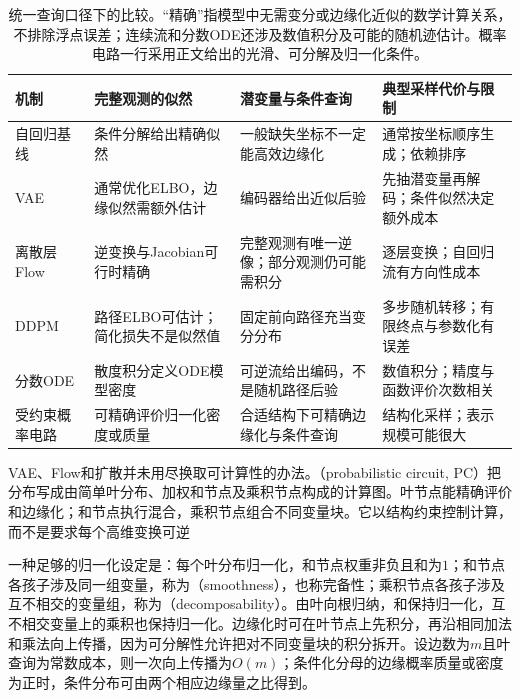 \begin{table}[htbp]
  \centering
  \small
  \begin{tabularx}{\linewidth}{@{}lXXX@{}}
    \toprule
    机制 & 完整观测的似然 & 潜变量与条件查询 & 典型采样代价与限制 \\
    \midrule
    自回归基线
      & 条件分解给出精确似然
      & 一般缺失坐标不一定能高效边缘化
      & 通常按坐标顺序生成；依赖排序 \\
    VAE
      & 通常优化ELBO，边缘似然需额外估计
      & 编码器给出近似后验
      & 先抽潜变量再解码；条件似然决定额外成本 \\
    离散层Flow
      & 逆变换与Jacobian可行时精确
      & 完整观测有唯一逆像；部分观测仍可能需积分
      & 逐层变换；自回归流有方向性成本 \\
    DDPM
      & 路径ELBO可估计；简化损失不是似然值
      & 固定前向路径充当变分分布
      & 多步随机转移；有限终点与参数化有误差 \\
    分数ODE
      & 散度积分定义ODE模型密度
      & 可逆流给出编码，不是随机路径后验
      & 数值积分；精度与函数评价次数相关 \\
    受约束概率电路
      & 可精确评价归一化密度或质量
      & 合适结构下可精确边缘化与条件查询
      & 结构化采样；表示规模可能很大 \\
    \bottomrule
  \end{tabularx}
  \caption{统一查询口径下的比较。“精确”指模型中无需变分或边缘化近似的数学计算关系，不排除浮点误差；连续流和分数ODE还涉及数值积分及可能的随机迹估计。概率电路一行采用正文给出的光滑、可分解及归一化条件。}
  \label{tab:pgm-generative-model-comparison}
\end{table}

VAE、Flow和扩散并未用尽换取可计算性的办法。（probabilistic circuit, PC）把分布写成由简单叶分布、加权和节点及乘积节点构成的计算图。叶节点能精确评价和边缘化；和节点执行混合，乘积节点组合不同变量块。它以结构约束控制计算，而不是要求每个高维变换可逆

一种足够的归一化设定是：每个叶分布归一化，和节点权重非负且和为$1$；和节点各孩子涉及同一组变量，称为（smoothness），也称完备性；乘积节点各孩子涉及互不相交的变量组，称为（decomposability）。由叶向根归纳，和保持归一化，互不相交变量上的乘积也保持归一化。边缘化时可在叶节点上先积分，再沿相同加法和乘法向上传播，因为可分解性允许把对不同变量块的积分拆开。设边数为$m$且叶查询为常数成本，则一次向上传播为$O(m)$；条件化分母的边缘概率质量或密度为正时，条件分布可由两个相应边缘量之比得到。

